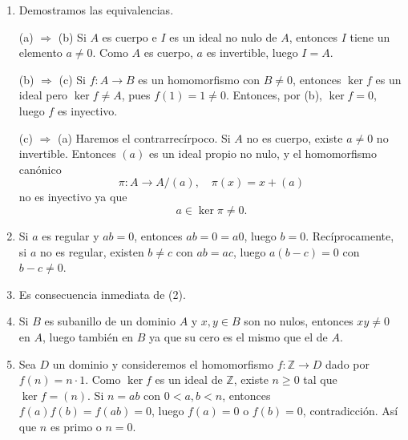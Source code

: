\begin{proofbox}

\begin{enumerate}
\item Demostramos las equivalencias.

(a) $\Rightarrow$ (b) Si $A$ es cuerpo e $I$ es un ideal no nulo de $A$, entonces $I$ tiene un elemento $a \neq 0$. Como $A$ es cuerpo, $a$ es invertible, luego $I = A$.

(b) $\Rightarrow$ (c) Si $f: A \to B$ es un homomorfismo con $B \neq 0$, entonces $\ker f$ es un ideal pero $\ker f \neq A$, pues $f(1) = 1 \neq 0$. Entonces, por (b), $\ker f = 0$, luego $f$ es inyectivo.

(c) $\Rightarrow$ (a) Haremos el contrarrecírpoco. Si $A$ no es cuerpo, existe $a \neq 0$ no invertible. Entonces $(a)$ es un ideal propio no nulo, y el homomorfismo canónico
\[
\pi: A \to A/(a),\quad \pi(x) = x + (a)
\]
no es inyectivo ya que
\[
a \in \ker\pi \neq 0.
\]

\item Si $a$ es regular y $ab = 0$, entonces $ab = 0 = a0$, luego $b = 0$. Recíprocamente, si $a$ no es regular, existen $b \neq c$ con $ab = ac$, luego $a(b-c) = 0$ con $b-c \neq 0$.

\item Es consecuencia inmediata de (2).

\item Si $B$ es subanillo de un dominio $A$ y $x, y \in B$ son no nulos, entonces $xy \neq 0$ en $A$, luego también en $B$ ya que su cero es el mismo que el de $A$.

\item Sea $D$ un dominio y consideremos el homomorfismo $f: \mathbb{Z} \to D$ dado por $f(n) = n\cdot 1$. Como $\ker f$ es un ideal de $\mathbb{Z}$, existe $n \geq 0$ tal que $\ker f = (n)$. Si $n = ab$ con $0 < a, b < n$, entonces $f(a)f(b) = f(ab) = 0$, luego $f(a) = 0$ o $f(b) = 0$, contradicción. Así que $n$ es primo o $n = 0$.
\end{enumerate}
\end{proofbox}

